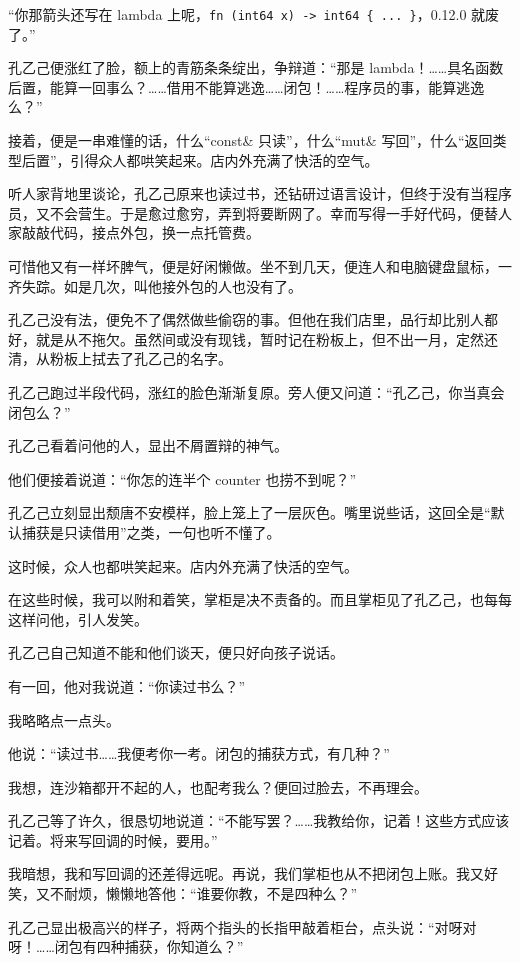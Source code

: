 “你那箭头还写在 lambda 上呢，\texttt{fn (\allowbreak{}int64 x)\allowbreak{} -\allowbreak{}>\allowbreak{} int64 \{ .\allowbreak{}.\allowbreak{}.\allowbreak{} \}}，0.12.0 就废了。”

孔乙己便涨红了脸，额上的青筋条条绽出，争辩道：“那是 lambda！……具名函数后置，能算一回事么？……借用不能算逃逸……闭包！……程序员的事，能算逃逸么？”

接着，便是一串难懂的话，什么“const\& 只读”，什么“mut\& 写回”，什么“返回类型后置”，引得众人都哄笑起来。店内外充满了快活的空气。

听人家背地里谈论，孔乙己原来也读过书，还钻研过语言设计，但终于没有当程序员，又不会营生。于是愈过愈穷，弄到将要断网了。幸而写得一手好代码，便替人家敲敲代码，接点外包，换一点托管费。

可惜他又有一样坏脾气，便是好闲懒做。坐不到几天，便连人和电脑键盘鼠标，一齐失踪。如是几次，叫他接外包的人也没有了。

孔乙己没有法，便免不了偶然做些偷窃的事。但他在我们店里，品行却比别人都好，就是从不拖欠。虽然间或没有现钱，暂时记在粉板上，但不出一月，定然还清，从粉板上拭去了孔乙己的名字。

孔乙己跑过半段代码，涨红的脸色渐渐复原。旁人便又问道：“孔乙己，你当真会闭包么？”

孔乙己看着问他的人，显出不屑置辩的神气。

他们便接着说道：“你怎的连半个 counter 也捞不到呢？”

孔乙己立刻显出颓唐不安模样，脸上笼上了一层灰色。嘴里说些话，这回全是“默认捕获是只读借用”之类，一句也听不懂了。

这时候，众人也都哄笑起来。店内外充满了快活的空气。

在这些时候，我可以附和着笑，掌柜是决不责备的。而且掌柜见了孔乙己，也每每这样问他，引人发笑。

孔乙己自己知道不能和他们谈天，便只好向孩子说话。

有一回，他对我说道：“你读过书么？”

我略略点一点头。

他说：“读过书……我便考你一考。闭包的捕获方式，有几种？”

我想，连沙箱都开不起的人，也配考我么？便回过脸去，不再理会。

孔乙己等了许久，很恳切地说道：“不能写罢？……我教给你，记着！这些方式应该记着。将来写回调的时候，要用。”

我暗想，我和写回调的还差得远呢。再说，我们掌柜也从不把闭包上账。我又好笑，又不耐烦，懒懒地答他：“谁要你教，不是四种么？”

孔乙己显出极高兴的样子，将两个指头的长指甲敲着柜台，点头说：“对呀对呀！……闭包有四种捕获，你知道么？”

